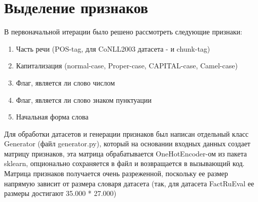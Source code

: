 \section{Выделение признаков}

В первоначальной итерации было решено рассмотреть следующие признаки:
\begin{enumerate}
    \item Часть речи (POS-tag, для CoNLL2003 датасета - и chunk-tag)
    \item Капитализация (normal-case, Proper-case, CAPITAL-case, Camel-case)
    \item Флаг, является ли слово числом
    \item Флаг, является ли слово знаком пунктуации
    \item Начальная форма слова
\end{enumerate}

Для обработки датасетов и генерации признаков был написан отдельный класс Generator (файл generator.py), который на основании входных данных создает матрицу признаков, эта матрица обрабатывается OneHotEncoder-ом из пакета sklearn, опционально сохраняется в файл и возвращается в вызывающий код. Матрица признаков получается очень разреженной, поскольку ее размер напрямую зависит от размера словаря датасета (так, для датасета FactRuEval ее размеры достигают 35.000 * 27.000)